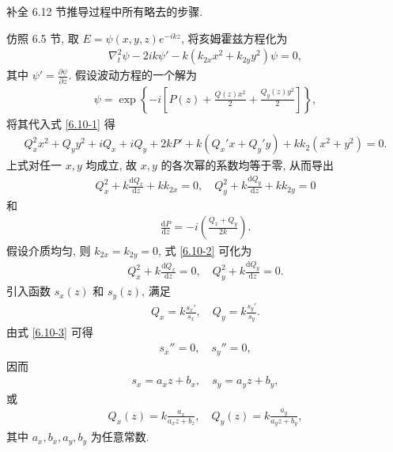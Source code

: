 \documentclass{note}
\begin{document}
\begin{exe}
    补全 6.12 节推导过程中所有略去的步骤.
\end{exe}
\begin{pf}
    仿照 6.5 节, 取 $E=\psi(x,y,z)e^{-ikz}$, 将亥姆霍兹方程化为
    \begin{align}
        \label{6.10-1}
        \nabla_t^2\psi-2ik\psi'-k(k_{2x}x^2+k_{2y}y^2)\psi=0,
    \end{align}
    其中 $\psi'=\frac{\partial\psi}{\partial z}$.
    假设波动方程的一个解为
    \begin{align}
        \psi=\exp\left\{-i\left[P(z)+\frac{Q(z)x^2}{2}+\frac{Q_y(z)y^2}{2}\right]\right\},
    \end{align}
    将其代入式 \eqref{6.10-1} 得
    \begin{align}
        Q_x^2x^2+Q_yy^2+iQ_x+iQ_y+2kP'+k(Q_x'x+Q_y'y)+kk_2(x^2+y^2)=0.
    \end{align}
    上式对任一 $x,y$ 均成立, 故 $x,y$ 的各次幂的系数均等于零, 从而导出
    \begin{align}
        \label{6.10-2}
        Q_x^2+k\frac{\mathrm{d}Q_x}{\mathrm{d}z}+kk_{2x}=0,\quad Q_y^2+k\frac{\mathrm{d}Q_y}{\mathrm{d}z}+kk_{2y}=0
    \end{align}
    和
    \begin{align}
        \label{6.10-5}
        \frac{\mathrm{d}P}{\mathrm{d}z}=-i\left(\frac{Q_x+Q_y}{2k}\right).
    \end{align}
    假设介质均匀, 则 $k_{2x}=k_{2y}=0$, 式 \eqref{6.10-2} 可化为
    \begin{align}
        \label{6.10-3}
        Q_x^2+k\frac{\mathrm{d}Q_x}{\mathrm{d}z}=0,\quad Q_y^2+k\frac{\mathrm{d}Q_y}{\mathrm{d}z}=0.
    \end{align}
    引入函数 $s_x(z)$ 和 $s_y(z)$, 满足
    \begin{align}
        Q_x=k\frac{s_x'}{s_x},\quad Q_y=k\frac{s_y'}{s_y}.
    \end{align}
    由式 \eqref{6.10-3} 可得
    \begin{align}
        s_x''=0,\quad s_y''=0,
    \end{align}
    因而
    \begin{align}
        s_x=a_xz+b_x,\quad s_y=a_yz+b_y,
    \end{align}
    或
    \begin{align}
        \label{6.10-4}
        Q_x(z)=k\frac{a_x}{a_xz+b_z},\quad Q_y(z)=k\frac{a_y}{a_yz+b_y},
    \end{align}
    其中 $a_x,b_x,a_y,b_y$ 为任意常数.

\end{pf}
\end{document}
